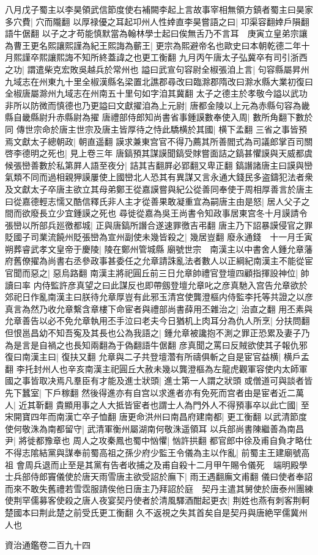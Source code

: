 八月戊子蜀主以李昊領武信節度使右補闕李起上言故事宰相無領方鎮者蜀主曰昊家多穴費|{
	穴而隴翻}
以厚禄優之耳起卭州人性婞直李昊嘗語之曰|{
	卭渠容翻婞戶隕翻語牛倨翻}
以子之才苟能慎默當為翰林學士起曰俟無舌乃不言耳　庚寅立皇弟宗讓為曹王更名熙讓熙謹為紀王熙誨為蘄王|{
	更宗為熙避帝名也歐史曰本朝乾德二年十月熙謹卒熙讓熙誨不知所終蓋諱之也更工衡翻}
九月丙午唐太子弘冀卒有司引浙西之功|{
	謂遣柴克宏敗吳越兵於常州也}
謚曰武宣句容尉全椒張洎上言|{
	句容縣屬昇州九域志在州東九十里全椒漢縣名梁置北譙郡尋改曰臨滁郡隋改曰滁水縣大業初復曰全椒唐屬滁州九域志在州南五十里句如字洎其冀翻}
太子之德主於孝敬今謚以武功非所以防微而慎德也乃更謚曰文獻擢洎為上元尉|{
	唐都金陵以上元為赤縣句容為畿縣自畿縣尉升赤縣尉為擢}
唐禮部侍郎知尚書省事鍾謨數奉使入周|{
	數所角翻下數於同}
傳世宗命於唐主世宗及唐主皆厚待之恃此驕横於其國|{
	横下孟翻}
三省之事皆預焉文獻太子總朝政|{
	朝直遥翻}
謨求兼東宫官不得乃薦其所善閻式為司議郎掌百司關啓李德明之死也|{
	見上卷三年}
唐鎬預其謀謨聞鎬受賕嘗面詰之鎬甚懼謨與天威都虞候張巒善數於私第屛人語至夜分|{
	詰其吉翻屛必郢翻又卑正翻}
鎬譖諸唐主曰謨與巒氣類不同而過相親狎謨屢使上國巒北人恐其有異謀又言永通大錢民多盗鑄犯法者衆及文獻太子卒唐主欲立其母弟鄭王從嘉謨嘗與紀公從善同奉使于周相厚善言於唐主曰從嘉德輕志懦又酷信釋氏非人主才從善果敢凝重宜為嗣唐主由是怒|{
	居人父子之間而欲廢長立少宜鍾謨之死也}
尋徙從嘉為吳王尚書令知政事居東宫冬十月謨請令張巒以所部兵廵徼都城|{
	正與唐鎬所譖合遂速罪徼吉弔翻}
唐主乃下詔暴謨侵官之罪貶國子司業流饒州貶張巒為宣州副使未幾皆殺之|{
	幾居豈翻}
廢永通錢　十一月壬寅朔葬睿武孝文皇帝于慶陵|{
	陵在鄭州管城縣}
廟號世宗　南漢主以中書舍人鍾允章藩府舊僚擢為尚書右丞參政事甚委任之允章請誅亂法者數人以正綱紀南漢主不能從宦官聞而惡之|{
	惡烏路翻}
南漢主將祀圓丘前三日允章帥禮官登壇四顧指揮設神位|{
	帥讀曰率}
内侍監許彦真望之曰此謀反也即帶劔登壇允章叱之彦真馳入宫告允章欲於郊祀日作亂南漢主曰朕待允章厚豈有此邪玉清宫使龔澄樞内侍監李托等共證之以彦真言為然乃收允章繫含章樓下命宦者與禮部尚書薛用丕雜治之|{
	治直之翻}
用丕素與允章善告以必不免允章執用丕手泣曰老夫今日猶机上肉耳分為仇人所烹|{
	分扶問翻}
但恨邕昌幼不知吾寃及其長也公為我語之|{
	鍾允章被讒抱不測之罪正恐累及妻子乃為是言是自禍之也長知兩翻為于偽翻語牛倨翻}
彦真聞之罵曰反賊欲使其子報仇邪復曰南漢主曰|{
	復扶又翻}
允章與二子共登壇濳有所禱俱斬之自是宦官益横|{
	横戶孟翻}
李托封州人也辛亥南漢主祀圓丘大赦未幾以龔澄樞為左龍虎觀軍容使内太師軍國之事皆取决焉凡羣臣有才能及進士狀頭|{
	進士第一人謂之狀頭}
或僧道可與談者皆先下蠶室|{
	下戶稼翻}
然後得進亦有自宫以求進者亦有免死而宫者由是宦者近二萬人|{
	近其靳翻}
貴顯用事之人大抵皆宦者也謂士人為門外人不得預事卒以此亡國|{
	至宋開寶四年而南漢亡卒子恤翻}
唐更命洪州曰南昌府建南都|{
	更工衡翻}
以武清節度使何敬洙為南都留守|{
	武清軍衡州屬湖南何敬洙遥領耳}
以兵部尚書陳繼善為南昌尹|{
	將徙都豫章也}
周人之攻秦鳳也蜀中忷懼|{
	忷許拱翻}
都官郎中徐及甫自負才略仕不得志隂結黨與謀奉前蜀高祖之孫少府少監王令儀為主以作亂|{
	前蜀主王建廟號高祖}
會周兵退而止至是其黨有告者收捕之及甫自殺十二月甲午賜令儀死　端明殿學士兵部侍郎竇儀使於唐天雨雪唐主欲受詔於廡下|{
	雨王遇翻廡文甫翻}
儀曰使者奉詔而來不敢失舊禮若雪霑服請俟他日唐主乃拜詔於庭　契丹主遣其舅使於唐泰州團練使荆罕儒募客使殺之唐人夜宴契丹使者於清風驛酒酣起更衣|{
	荆姓也燕有刺客荆軻楚國本曰荆此楚之前受氏更工衡翻}
久不返視之失其首矣自是契丹與唐絶罕儒冀州人也

資治通鑑卷二百九十四

